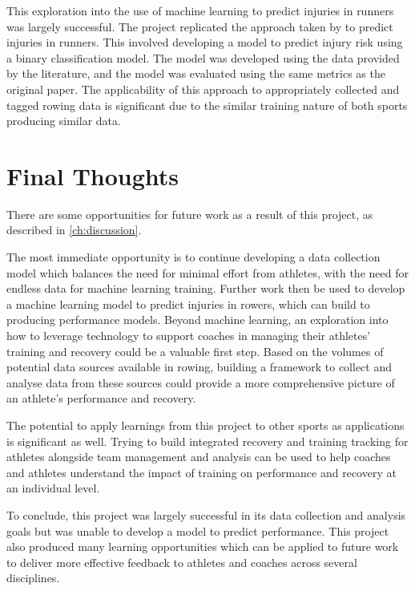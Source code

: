 This exploration into the use of machine learning to predict injuries in runners was largely successful. The project replicated the approach taken by \textcite{Lovdal2021} to predict injuries in runners. This involved developing a model to predict injury risk using a binary classification model. The model was developed using the data provided by the literature, and the model was evaluated using the same metrics as the original paper. The applicability of this approach to appropriately collected and tagged rowing data is significant due to the similar training nature of both sports producing similar data.

\section{Final Thoughts}
There are some opportunities for future work as a result of this project, as described in \autoref{ch:discussion}. 

The most immediate opportunity is to continue developing a data collection model which balances the need for minimal effort from athletes, with the need for endless data for machine learning training. Further work then be used to develop a machine learning model to predict injuries in rowers, which can build to producing performance models. Beyond machine learning, an exploration into how to leverage technology to support coaches in managing their athletes' training and recovery could be a valuable first step. Based on the volumes of potential data sources available in rowing, building a framework to collect and analyse data from these sources could provide a more comprehensive picture of an athlete's performance and recovery.

The potential to apply learnings from this project to other sports as applications is significant as well. Trying to build integrated recovery and training tracking for athletes alongside team management and analysis can be used to help coaches and athletes understand the impact of training on performance and recovery at an individual level.

To conclude, this project was largely successful in its data collection and analysis goals but was unable to develop a model to predict performance. This project also produced many learning opportunities which can be applied to future work to deliver more effective feedback to athletes and coaches across several disciplines.